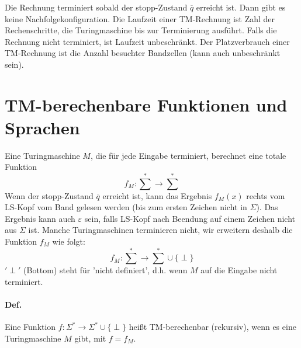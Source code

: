 \par\medskip
Die Rechnung terminiert sobald der stopp-Zustand $\overline{q}$ erreicht ist. Dann gibt es keine Nachfolgekonfiguration. Die Laufzeit einer TM-Rechnung ist Zahl der Rechenschritte, die Turingmaschine bis zur Terminierung ausführt. Falls die Rechnung nicht terminiert, ist Laufzeit unbeschränkt. Der Platzverbrauch einer TM-Rechnung ist die Anzahl besuchter Bandzellen (kann auch unbeschränkt sein).
\par\medskip

\section{TM-berechenbare Funktionen und Sprachen}

Eine Turingmaschine $M$, die für jede Eingabe terminiert, berechnet eine totale Funktion $$f_M:\sum\limits^* \rightarrow \sum\limits^*$$ Wenn der stopp-Zustand $\overline{q}$ erreicht ist, kann das Ergebnis $f_M(x)$ rechts vom LS-Kopf vom Band gelesen werden (bis zum ersten Zeichen nicht in $\Sigma$). Das Ergebnis kann auch $\varepsilon$ sein,  falls LS-Kopf nach Beendung auf einem Zeichen nicht aus $\Sigma$ ist. Manche Turingmaschinen terminieren nicht, wir erweitern deshalb die Funktion $f_M$ wie folgt: $$ f_M:\sum\limits^* \rightarrow \sum\limits^* \cup \{ \perp \} $$ $'\perp'$ (Bottom) steht für 'nicht definiert', d.h. wenn $M$ auf die Eingabe nicht terminiert.

\paragraph*{Def.} Eine Funktion $f:\Sigma^* \rightarrow \Sigma^* \cup \{ \perp \}$ heißt TM-berechenbar (rekursiv), wenn es eine Turingmaschine $M$ gibt, mit $f=f_M$.